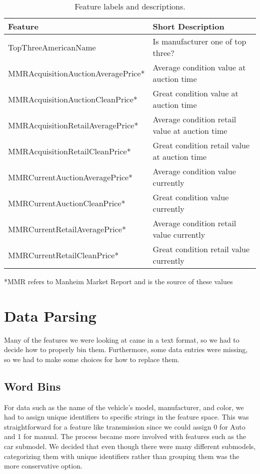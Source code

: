 \documentclass[paper=letter, fontsize=11pt]{scrartcl} %
\numberwithin{equation}{section} %
\begin{document}
\begin{table}[!ht]
	\begin{center}
	 \begin{tabular}{ | p{6.42cm} | p{8.42cm} |}
	 \hline
		{\bf Feature}	& {\bf Short Description}  \\ \hline
		TopThreeAmericanName & Is manufacturer one of top three? \\ \hline
		MMRAcquisitionAuctionAveragePrice* & Average condition value at auction time \\ \hline
		MMRAcquisitionAuctionCleanPrice* & Great condition value at auction time \\ \hline
		MMRAcquisitionRetailAveragePrice* & Average condition retail value at auction time \\ \hline
		MMRAcquisitionRetailCleanPrice* & Great condition retail value at auction time \\ \hline
		MMRCurrentAuctionAveragePrice* & Average condition value currently \\ \hline
		MMRCurrentAuctionCleanPrice* & Great condition value currently \\ \hline
		MMRCurrentRetailAveragePrice* & Average condition retail value currently \\ \hline
		MMRCurrentRetailCleanPrice* & Great condition retail value currently \\ \hline
	 \end{tabular}
	\end{center}
  \caption{Feature labels and descriptions.}
	\begin{center}
	*MMR refers to Manheim Market Report and is the source of these values
	\end{center}
\end{table}

\section{Data Parsing}
	Many of the features we were looking at came in a text format, so we had to decide how to properly bin them. Furthermore, some data entries were missing, so we had to make some choices for how to replace them.

\subsection{Word Bins}
	For data such as the name of the vehicle's model, manufacturer, and color, we had to assign unique identifiers to specific strings in the feature space. This was straightforward for a feature like transmission since we could assign 0 for Auto and 1 for manual. The process became more involved with features such as the car submodel. We decided that even though there were many different submodels, categorizing them with unique identifiers rather than grouping them was the more conservative option.
\end{document}
